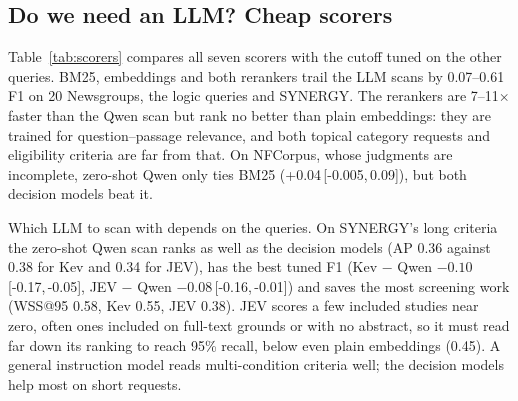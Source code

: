 \documentclass[11pt]{article}
\newcommand{\ci}[2]{\,[#1,\,#2]}
\begin{document}
\subsection{Do we need an LLM? Cheap scorers}
\label{sec:scorers}

Table~\ref{tab:scorers} compares all seven scorers with the cutoff tuned on the
other queries. BM25, embeddings and both rerankers trail the LLM scans by
0.07--0.61 F1 on 20 Newsgroups, the logic queries and SYNERGY. The rerankers are
7--11$\times$ faster than the Qwen scan but rank no better than plain
embeddings: they are trained for question--passage relevance, and both topical
category requests and eligibility criteria are far from that. On NFCorpus,
whose judgments are incomplete, zero-shot Qwen only ties BM25
(+0.04\ci{-0.005}{0.09}), but both decision models beat it.

Which LLM to scan with depends on the queries. On SYNERGY's long criteria the
zero-shot Qwen scan ranks as well as the decision models (AP 0.36 against 0.38
for Kev and 0.34 for JEV), has the best tuned F1 (Kev $-$ Qwen
$-0.10$\ci{-0.17}{-0.05}, JEV $-$ Qwen $-0.08$\ci{-0.16}{-0.01}) and saves the
most screening work (WSS@95 0.58, Kev 0.55, JEV 0.38). JEV scores a few included
studies near zero, often ones included on full-text grounds or with no
abstract, so it must read far down its ranking to reach 95\% recall, below even
plain embeddings (0.45). A general instruction model reads multi-condition
criteria well; the decision models help most on short requests.
\end{document}
